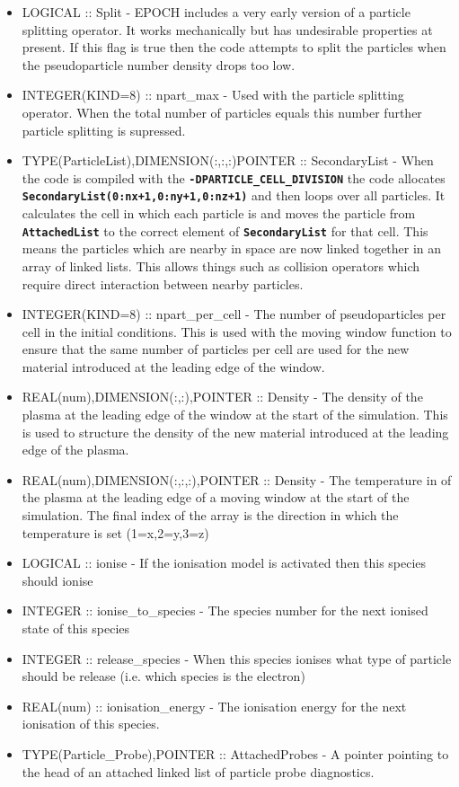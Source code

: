 \documentclass[12pt]{article}
\newcommand{\inlinecode}[1]{{\color{warwickred} \bf\texttt{#1}}}
\newcommand{\EPOCH}{{\color{warwickdark}\fontfamily{phv}\selectfont EPOCH} }
\begin{document}
\begin{itemize}
\item LOGICAL :: Split - \EPOCH includes a very early version of a particle
  splitting operator. It works mechanically but has undesirable properties at
  present. If this flag is true then the code attempts to split the particles
  when the pseudoparticle number density drops too low.
\item INTEGER(KIND=8) :: npart\_max - Used with the particle splitting
  operator. When the total number of particles equals this number further
  particle splitting is supressed.
\item TYPE(ParticleList),DIMENSION(:,:,:)POINTER :: SecondaryList - When the
  code is compiled with the \inlinecode{-DPARTICLE\_CELL\_DIVISION} the code
  allocates \inlinecode{SecondaryList(0:nx+1,0:ny+1,0:nz+1)} and then loops
  over all particles. It calculates the cell in which each particle is and
  moves the particle from \inlinecode{AttachedList} to the correct element of
  \inlinecode{SecondaryList} for that cell. This means the particles which are
  nearby in space are now linked together in an array of linked lists. This
  allows things such as collision operators which require direct interaction
  between nearby particles.
\item INTEGER(KIND=8) :: npart\_per\_cell - The number of pseudoparticles per
  cell in the initial conditions. This is used with the moving window function
  to ensure that the same number of particles per cell are used for the new
  material introduced at the leading edge of the window.
\item REAL(num),DIMENSION(:,:),POINTER :: Density - The density of the plasma
  at the leading edge of the window at the start of the simulation. This is
  used to structure the density of the new material introduced at the leading
  edge of the plasma.
\item REAL(num),DIMENSION(:,:,:),POINTER :: Density - The temperature in of
  the plasma at the leading edge of a moving window at the start of the
  simulation. The final index of the array is the direction in which the
  temperature is set (1=x,2=y,3=z)
\item LOGICAL :: ionise - If the ionisation model is activated then this
  species should ionise
\item INTEGER :: ionise\_to\_species - The species number for the next ionised
  state of this species
\item INTEGER :: release\_species - When this species ionises what type of
  particle should be release (i.e. which species is the electron)
\item REAL(num) :: ionisation\_energy - The ionisation energy for the next
  ionisation of this species.
\item TYPE(Particle\_Probe),POINTER :: AttachedProbes - A pointer pointing to
  the head of an attached linked list of particle probe diagnostics.
\end{itemize}
\end{document}
